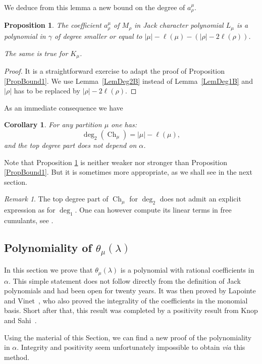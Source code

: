 \documentclass[11pt]{amsart}
\theoremstyle{plain}
\newtheorem{corollary}[lemma]{Corollary}
\newtheorem{proposition}[lemma]{Proposition}
\theoremstyle{remark}
\newtheorem*{remark}{Remark}
\DeclareMathOperator{\Ch}{Ch}
\begin{document}
We deduce from this lemma a new bound on the degree of $a_\rho^\mu$.
\begin{proposition}
    \label{PropBound2}
    The coefficient $a^\mu_\rho$ of $M_\rho$ in
    Jack character polynomial $L_\mu$ is a polynomial in $\gamma$
    of degree smaller or equal to $|\mu|-\ell(\mu) - (|\rho|-2\ell(\rho))$.

    The same is true for $K_\mu$.
\end{proposition}
\begin{proof}
    It is a straightforward exercise to adapt the proof of Proposition \ref{PropBound1}.
    We use Lemma~\ref{LemDeg2B} instead of Lemma~\ref{LemDeg1B} and 
    $|\rho|$ has to be replaced by $|\rho| - 2\ell(\rho)$.
\end{proof}
As an immediate consequence we have
\begin{corollary}
For any partition $\mu$ one has:
\[ \deg_2(\Ch_\mu) = |\mu| - \ell(\mu),\]
and the top degree part does not depend on $\alpha$.
\end{corollary}

Note that Proposition \ref{PropBound2} is neither weaker nor stronger than Proposition \ref{PropBound1}.
But it is sometimes more appropriate, as we shall see in the next section.


\begin{remark}
    The top degree part of $\Ch_\mu$ for $\deg_2$ does not admit an
    explicit expression as for $\deg_1$.
    One can however compute its linear terms in free cumulants,
    see \cite[Section 3]{FerayGouldenHook}.
\end{remark}

\subsection{Polynomiality of $\theta_\mu(\lambda)$}\label{SubsectCoefJackPoly}
In this section we prove that $\theta_\mu(\lambda)$ is a polynomial
with rational coefficients in $\alpha$.
This simple statement does not follow directly from the definition of Jack polynomials
and had been open for twenty years.
It was then proved by Lapointe and Vinet~\cite{LapointeVinetJack},
who also proved the integrality of the coefficients in the monomial basis.
Short after that, this result was completed by a positivity result
from Knop and Sahi~\cite{KnopSahiCombinatoricsJack}.

Using the material of this Section, we can find a new proof of the polynomiality
in $\alpha$.
Integrity and positivity seem unfortunately impossible to obtain {\em via} this method.
\end{document}
